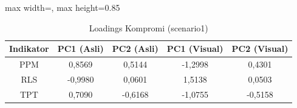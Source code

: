 \begin{table}[H]
\centering
\caption{Loadings Kompromi (scenario1)} \label{tab:sample1loadings}
\begin{adjustbox}{max width=\textwidth, max height=0.85\textheight}
\begin{tabular}{|c|c|c|c|c|}
\hline
\textbf{Indikator} & \textbf{PC1 (Asli)} & \textbf{PC2 (Asli)} & \textbf{PC1 (Visual)} & \textbf{PC2 (Visual)} \\
\hline
PPM & 0,8569 & 0,5144 & -1,2998 & 0,4301 \\
RLS & -0,9980 & 0,0601 & 1,5138 & 0,0503 \\
TPT & 0,7090 & -0,6168 & -1,0755 & -0,5158 \\
\hline
\end{tabular}
\end{adjustbox}
\end{table}